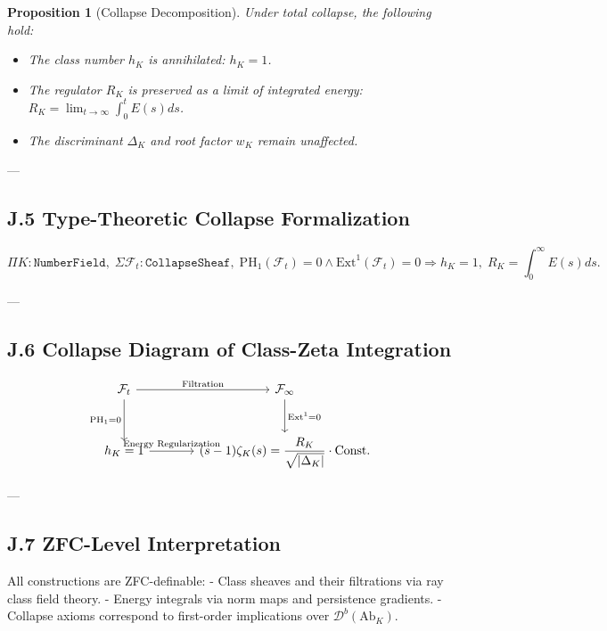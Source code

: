 \documentclass[11pt]{article}
\newtheorem{proposition}[theorem]{Proposition}
\begin{document}
\begin{proposition}[Collapse Decomposition]
Under total collapse, the following hold:
\begin{itemize}
  \item The class number $h_K$ is annihilated: $h_K = 1$.
  \item The regulator $R_K$ is preserved as a limit of integrated energy: $R_K = \lim_{t \to \infty} \int_0^t E(s) ds$.
  \item The discriminant $\Delta_K$ and root factor $w_K$ remain unaffected.
\end{itemize}
\end{proposition}

---

\subsection*{J.5 Type-Theoretic Collapse Formalization}

\[
\Pi K : \texttt{NumberField},\;
\Sigma \mathcal{F}_t : \texttt{CollapseSheaf},\;
\mathrm{PH}_1(\mathcal{F}_t) = 0 \wedge \mathrm{Ext}^1(\mathcal{F}_t) = 0
\Rightarrow
h_K = 1, \;
R_K = \int_0^\infty E(s) ds.
\]

---

\subsection*{J.6 Collapse Diagram of Class-Zeta Integration}

\[
\begin{tikzcd}[column sep=large, row sep=large]
\mathcal{F}_t \arrow[r, "\text{Filtration}"] \arrow[d, "\mathrm{PH}_1 = 0"'] 
& \mathcal{F}_\infty \arrow[d, "\mathrm{Ext}^1 = 0"] \\
h_K = 1 \arrow[r, "\text{Energy Regularization}"] 
& (s - 1)\zeta_K(s) = \dfrac{R_K}{\sqrt{|\Delta_K|}} \cdot \text{Const.}
\end{tikzcd}
\]

---

\subsection*{J.7 ZFC-Level Interpretation}

All constructions are ZFC-definable:
- Class sheaves and their filtrations via ray class field theory.
- Energy integrals via norm maps and persistence gradients.
- Collapse axioms correspond to first-order implications over $\mathcal{D}^b(\text{Ab}_K)$.
\end{document}

